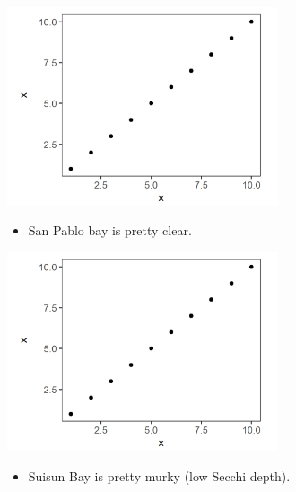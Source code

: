 \documentclass[]{article}\usepackage[]{graphicx}\usepackage[]{color}
\begin{document}
\begin{Row}
  \begin{Cell}{4}
    \begin{center}
      \includegraphics[width=8cm,align=m]{figures/secchi/placeholder_fig.png}
      \vspace{0.5cm}
      \begin{itemize}[leftmargin=1.5cm,rightmargin=1cm]
        \item San Pablo bay is pretty clear.
      \end{itemize}
    \end{center}
  \end{Cell}

  \begin{Cell}{4}
    \begin{center}
      \includegraphics[width=8cm,align=m]{figures/secchi/placeholder_fig.png}
      \vspace{0.5cm}
      \begin{itemize}[leftmargin=1.5cm,rightmargin=1cm]
        \item Suisun Bay is pretty murky (low Secchi depth).
      \end{itemize}
    \end{center}
  \end{Cell}


\end{Row}
\end{document}
